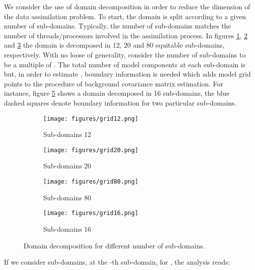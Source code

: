 \documentclass[12pt]{article}
\begin{document}
We consider the use of domain decomposition in order to reduce the dimension of the data assimilation problem. To start, the domain is split according to a given number of sub-domains. Typically, the number of sub-domains matches the number of threads/processors involved in the assimilation process. In figures \ref{fig:SD12}, \ref{fig:SD20} and \ref{fig:SD80} the domain is decomposed in 12, 20 and 80 equitable sub-domains, respectively. With no loose of generality, consider the number of sub-domains  to be a multiple of . The total number of model components at each sub-domain is  but, in order to estimate , boundary information is needed which adds  model grid points to the procedure of background covariance matrix estimation. For instance, figure \ref{fig:SD16-boundaries} shows a domain decomposed in 16 sub-domains, the blue dashed squares denote boundary information for two particular sub-domains. 
\begin{figure}[htp]
\centering
\begin{subfigure}{0.45\textwidth}
\centering
\texttt{[image: figures/grid12.png]}
\caption{Sub-domains 12}
\label{fig:SD12}
\end{subfigure}\begin{subfigure}{0.45\textwidth}
\centering
\texttt{[image: figures/grid20.png]}
\caption{Sub-domains 20}
\label{fig:SD20}
\end{subfigure}

\begin{subfigure}{0.45\textwidth}
\centering
\texttt{[image: figures/grid80.png]}
\caption{Sub-domains 80}
\label{fig:SD80}
\end{subfigure}\begin{subfigure}{0.45\textwidth}
\centering
\texttt{[image: figures/grid16.png]}
\caption{Sub-domains 16}
\label{fig:SD16-boundaries}
\end{subfigure}
\caption{Domain decomposition for different number of sub-domains. }
\end{figure}
If we consider  sub-domains, at the -th sub-domain, for , the analysis reads:
\end{document}
